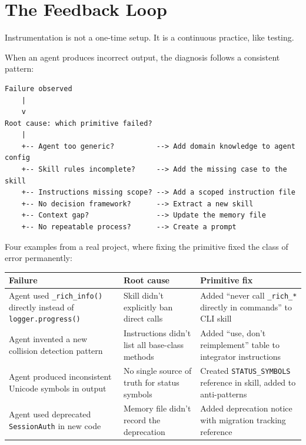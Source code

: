 \documentclass[
  a4paper,
  DIV=11,
  numbers=noendperiod]{scrreprt}
\newcounter{none} %
\begin{document}
\section{The Feedback Loop}\label{the-feedback-loop}

Instrumentation is not a one-time setup. It is a continuous practice,
like testing.

When an agent produces incorrect output, the diagnosis follows a
consistent pattern:

\begin{verbatim}
Failure observed
    |
    v
Root cause: which primitive failed?
    |
    +-- Agent too generic?          --> Add domain knowledge to agent config
    +-- Skill rules incomplete?     --> Add the missing case to the skill
    +-- Instructions missing scope? --> Add a scoped instruction file
    +-- No decision framework?      --> Extract a new skill
    +-- Context gap?                --> Update the memory file
    +-- No repeatable process?      --> Create a prompt
\end{verbatim}

Four examples from a real project, where fixing the primitive fixed the
class of error permanently:

{\def\LTcaptype{none} %
\begin{longtable}[]{@{}
  >{\raggedright\arraybackslash}p{}
  >{\raggedright\arraybackslash}p{}
  >{\raggedright\arraybackslash}p{}@{}}
\toprule\noalign{}
\begin{minipage}[b]{\linewidth}\raggedright
Failure
\end{minipage} & \begin{minipage}[b]{\linewidth}\raggedright
Root cause
\end{minipage} & \begin{minipage}[b]{\linewidth}\raggedright
Primitive fix
\end{minipage} \\
\midrule\noalign{}
\endhead
\bottomrule\noalign{}
\endlastfoot
Agent used \texttt{\_rich\_info()} directly instead of
\texttt{logger.progress()} & Skill didn't explicitly ban direct calls &
Added ``never call \texttt{\_rich\_*} directly in commands'' to CLI
skill \\
Agent invented a new collision detection pattern & Instructions didn't
list all base-class methods & Added ``use, don't reimplement'' table to
integrator instructions \\
Agent produced inconsistent Unicode symbols in output & No single source
of truth for status symbols & Created \texttt{STATUS\_SYMBOLS} reference
in skill, added to anti-patterns \\
Agent used deprecated \texttt{SessionAuth} in new code & Memory file
didn't record the deprecation & Added deprecation notice with migration
tracking reference \\
\end{longtable}
}
\end{document}
